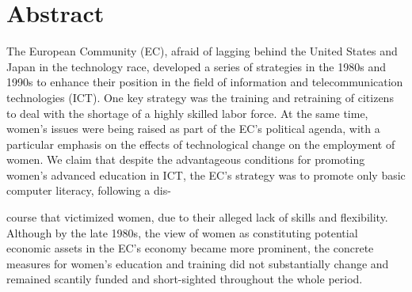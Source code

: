 \documentclass{tufte-handout}
\begin{document}
\begin{titlepage}
\begin{fullwidth}
\end{fullwidth}

\vspace*{1em}


\hypertarget{abstract}{%
\section{Abstract}\label{abstract}}

The European Community (EC), afraid of lagging behind the United States
and Japan in the technology race, developed a series of strategies in
the 1980s and 1990s to enhance their position in the field of
information and telecommunication technologies (ICT). One key strategy
was the training and retraining of citizens to deal with the shortage of
a highly skilled labor force. At the same time, women's issues were
being raised as part of the EC's political agenda, with a particular
emphasis on the effects of technological change on the employment of
women. We claim that despite the advantageous conditions for promoting
women's advanced education in ICT, the EC's strategy was to promote only
basic computer literacy, following a dis-

\enlargethispage{2\baselineskip}

\vspace*{2em}


 \end{titlepage}


\noindent course that victimized women,
due to their alleged lack of skills and flexibility. Although by the
late 1980s, the view of women as
constituting potential economic assets
in the EC's economy became more prominent, the concrete measures for
women's education and training did not substantially change and remained
scantily funded and short-sighted throughout the whole period.

\vspace*{2em}
\end{document}
